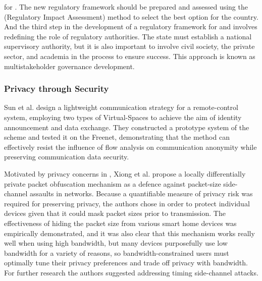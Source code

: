 for \hyperlink{\acronym}{\acronym}. The new regulatory framework should be prepared and assessed using the
\hyperlink{\acronym}{\acronym} (Regulatory Impact Assessment) method to select the best option for the country. And the
third step in the development of a regulatory framework for \hyperlink{\acronym}{\acronym} and \hyperlink{\acronym}{\acronym} involves
redefining the role of regulatory authorities. The state must establish a national
supervisory authority, but it is also important to involve civil society, the private
sector, and academia in the process to ensure success. This approach is known as
multistakeholder governance development.

\subsubsection{Privacy through Security}

Sun et al. \cite{SunSecure} design a lightweight communication strategy
for a remote-control system, employing two types of Virtual-Spaces to achieve
the aim of identity announcement and data exchange. They constructed a prototype
system of the scheme and tested it on the Freenet, demonstrating that the
method can effectively resist the influence of flow analysis on communication
anonymity while preserving communication data security.

Motivated by privacy concerns in \hyperlink{\acronym}{\acronym}, Xiong et al. \cite{xiong2018defending}
propose a locally differentially private packet obfuscation mechanism as
a defence against packet-size side-channel assaults in \hyperlink{\acronym}{\acronym} networks. Because
a quantifiable measure of privacy risk was required for preserving privacy,
the authors chose \hyperlink{\acronym}{\acronym} in order to protect individual
\hyperlink{\acronym}{\acronym} devices given that it could mask packet sizes prior to transmission.
The effectiveness of hiding the packet size from various smart home \hyperlink{\acronym}{\acronym}
devices was empirically demonstrated, and it was also clear that this mechanism
works really well when using high bandwidth, but many \hyperlink{\acronym}{\acronym} devices purposefully
use low bandwidth for a variety of reasons, so bandwidth-constrained users
must optimally tune their privacy preferences and trade off privacy with
bandwidth. For further research the authors suggested addressing timing side-channel
attacks.

